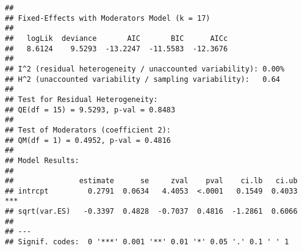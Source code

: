 \documentclass[
]{book}
\newenvironment{Shaded}{\begin{snugshade}}{\end{snugshade}}
\newcommand{\AttributeTok}[1]{\textcolor[rgb]{0.77,0.63,0.00}{#1}}
\newcommand{\DecValTok}[1]{\textcolor[rgb]{0.00,0.00,0.81}{#1}}
\newcommand{\FloatTok}[1]{\textcolor[rgb]{0.00,0.00,0.81}{#1}}
\newcommand{\FunctionTok}[1]{\textcolor[rgb]{0.00,0.00,0.00}{#1}}
\newcommand{\NormalTok}[1]{#1}
\newcommand{\OtherTok}[1]{\textcolor[rgb]{0.56,0.35,0.01}{#1}}
\newcommand{\SpecialCharTok}[1]{\textcolor[rgb]{0.00,0.00,0.00}{#1}}
\newcommand{\StringTok}[1]{\textcolor[rgb]{0.31,0.60,0.02}{#1}}
\theoremstyle{definition}
\theoremstyle{definition}
\theoremstyle{definition}
\theoremstyle{definition}
\theoremstyle{remark}
\begin{document}
\begin{Shaded}
\end{Shaded}

\begin{verbatim}
## 
## Fixed-Effects with Moderators Model (k = 17)
## 
##   logLik  deviance       AIC       BIC      AICc 
##   8.6124    9.5293  -13.2247  -11.5583  -12.3676   
## 
## I^2 (residual heterogeneity / unaccounted variability): 0.00%
## H^2 (unaccounted variability / sampling variability):   0.64
## 
## Test for Residual Heterogeneity:
## QE(df = 15) = 9.5293, p-val = 0.8483
## 
## Test of Moderators (coefficient 2):
## QM(df = 1) = 0.4952, p-val = 0.4816
## 
## Model Results:
## 
##               estimate      se     zval    pval    ci.lb   ci.ub 
## intrcpt         0.2791  0.0634   4.4053  <.0001   0.1549  0.4033  *** 
## sqrt(var.ES)   -0.3397  0.4828  -0.7037  0.4816  -1.2861  0.6066      
## 
## ---
## Signif. codes:  0 '***' 0.001 '**' 0.01 '*' 0.05 '.' 0.1 ' ' 1
\end{verbatim}
\end{document}
